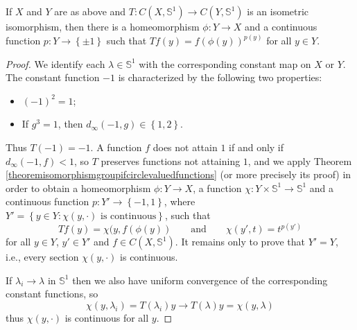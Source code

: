\begin{theorem}\label{theoremisometricisomorphismcirclegroups}
If $X$ and $Y$ are as above and $T:C(X,\mathbb{S}^1)\to C(Y,\mathbb{S}^1)$ is an isometric isomorphism, then there is a homeomorphism $\phi:Y\to X$ and a continuous function $p:Y\to\left\{\pm 1\right\}$ such that $Tf(y)=f(\phi(y))^{p(y)}$ for all $y\in Y$.
\end{theorem}
\begin{proof}
We identify each $\lambda\in\mathbb{S}^1$ with the corresponding constant map on $X$ or $Y$. The constant function $-1$ is characterized by the following two properties:
\begin{itemize}
\item $(-1)^2=1$;
\item If $g^3=1$, then $d_\infty(-1,g)\in\left\{1,2\right\}$.
\end{itemize}
Thus $T(-1)=-1$. A function $f$ does not attain $1$ if and only if $d_\infty(-1,f)<1$, so $T$ preserves functions not attaining $1$, and we apply Theorem \ref{theoremisomorphismgroupifcirclevaluedfunctions} (or more precisely its proof) in order to obtain a homeomorphism $\phi:Y\to X$, a function $\chi:Y\times\mathbb{S}^1\to\mathbb{S}^1$ and a continuous function $p:Y'\to\left\{-1,1\right\}$, where $Y'=\left\{y\in Y:\chi(y,\cdot)\text{ is continuous}\right\}$, such that
\[Tf(y)=\chi(y,f(\phi(y))\qquad\text{and}\qquad\chi(y',t)=t^{p(y')}\]
for all $y\in Y$, $y'\in Y'$ and $f\in C(X,\mathbb{S}^1)$. It remains only to prove that $Y'=Y$, i.e., every section $\chi(y,\cdot)$ is continuous.

If $\lambda_i\to\lambda$ in $\mathbb{S}^1$ then we also have uniform convergence of the corresponding constant functions, so
\[\chi(y,\lambda_i)=T(\lambda_i)y\to T(\lambda)y=\chi(y,\lambda)\]%
thus $\chi(y,\cdot)$ is continuous for all $y$.\qedhere
\end{proof}